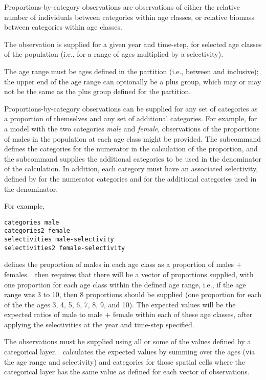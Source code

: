 
Proportions-by-category observations are observations of either the relative number of individuals between categories within age classes, or relative biomass between categories within age classes.

The observation is supplied for a given year and time-step, for selected age classes of the population (i.e., for a range of ages multiplied by a selectivity).

The age range must be ages defined in the partition (i.e., between  and  inclusive); the upper end of the age range can optionally be a plus group, which may or may not be the same as the plus group defined for the partition.

Proportions-by-category observations can be supplied for any set of categories as a proportion of themselves and any set of additional categories. For example, for a model with the two categories \emph{male} and \emph{female}, observations of the proportions of males in the population at each age class might be provided. The subcommand  defines the categories for the numerator in the calculation of the proportion, and the subcommand  supplies the additional categories to be used in the denominator of the calculation. In addition, each category must have an associated selectivity, defined by  for the numerator categories and  for the additional categories used in the denominator.

For example,

{\small{\begin{verbatim}
categories male
categories2 female
selectivities male-selectivity
selectivities2 female-selectivity
\end{verbatim}}}

defines the proportion of males in each age class as a proportion of males $+$ females. \CNAME\ then requires that there will be a vector of proportions supplied, with one proportion for each age class within the defined age range, i.e., if the age range was 3 to 10, then 8 proportions should be supplied (one proportion for each of the the ages 3, 4, 5, 6, 7, 8, 9, and 10). The expected values will be the expected ratios of male to male $+$ female within each of these age classes, after applying the selectivities at the year and time-step specified.

The observations must be supplied using all or some of the values defined by a categorical layer. \CNAME\ calculates the expected values by summing over the ages (via the age range and selectivity) and categories for those spatial cells where the categorical layer has the same value as defined for each vector of observations.

